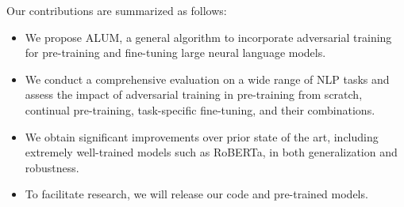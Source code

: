 \documentclass[11pt,a4paper]{article}
\newcommand\DNAME{ALUM}
\begin{document}
Our contributions are summarized as follows:
\begin{itemize}
    \item We propose {\DNAME}, a general algorithm to incorporate adversarial training for pre-training and fine-tuning large neural language models.
    \item We conduct a comprehensive evaluation on a wide range of NLP tasks and assess the impact of adversarial training in pre-training from scratch, continual pre-training, task-specific fine-tuning, and their combinations.
    \item We obtain significant improvements over prior state of the art, including extremely well-trained models such as RoBERTa, in both generalization and robustness.
    \item To facilitate research, we will release our code and pre-trained models.
\end{itemize}
\end{document}
